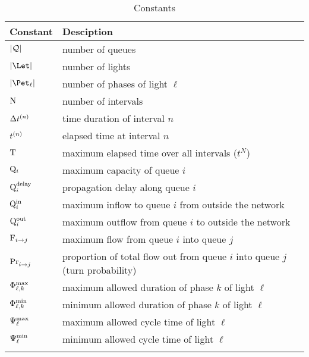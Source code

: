\begin{table}[t]
\caption{Constants}
\label{tab:constants}
\centering
\begin{tabular}{ll}
\toprule
Constant & Desciption\\ 
\midrule
$|\mathcal{\mathcal{Q}}|$ & number of queues  \\ [1mm]
$\Ln$ & number of lights\\ [1mm]
$\Pn$ & number of phases of light $\ell$\\[1mm]
$\mathrm{N}$ & number of intervals \\ [1mm]
$\Delta t^{(n)}$ & time duration of interval $n$\\ [1mm]
$t^{(n)}$ & elapsed time at interval $n$\\ [1mm]
$\mathrm{T}$ & maximum elapsed time over all intervals ($t^N$)\\ [1mm]
$\mathrm{Q}_{i}$ & maximum capacity of queue $i$\\ [1mm]
$\mathrm{Q}_{i}^{\mathrm{delay}}$ & propagation delay along queue $i$\\[1mm]
$\mathrm{Q}_{i}^{\mathrm{in}}$ & maximum inflow to queue $i$ from outside the network\\ [1mm]
$\mathrm{Q}_{i}^{\mathrm{out}}$ & maximum outflow from queue $i$ to outside the network\\[1mm]
$\mathrm{F}_{i\to j}$ & maximum flow from queue $i$ into queue $j$\\[1mm] 
$\mathrm{Pr}_{i\to j}^{\mathrm{}}$ & proportion of total flow out from queue $i$ into queue $j$ (turn probability)\\ [1mm]
$\mathrm{\Phi}_{\ell,k}^{\mathrm{max}}$ & maximum allowed duration of phase $k$ of light $\ell$\\ [1mm]
$\mathrm{\Phi}_{\ell,k}^{\mathrm{min}}$ & minimum allowed duration of phase $k$ of light $\ell$\\ [1mm]
$\mathrm{\Psi}_{\ell}^{\mathrm{max}}$ & maximum allowed cycle time of light $\ell$\\ [1mm]
$\mathrm{\Psi}_{\ell}^{\mathrm{min}}$ & minimum allowed cycle time of light $\ell$\\ [1mm]
\bottomrule\\
\end{tabular}
\end{table}

